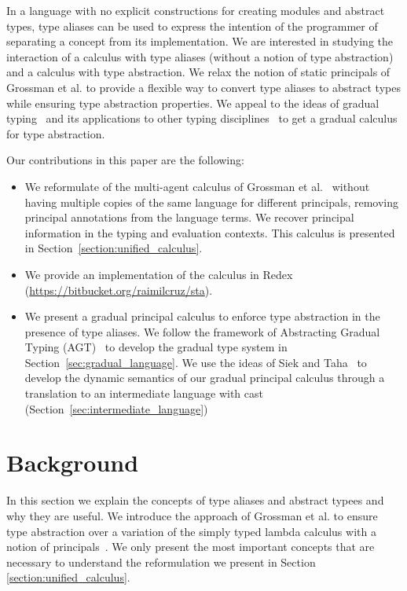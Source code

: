\documentclass{article}
\begin{document}
	In a language with no explicit constructions for creating modules and abstract types, type aliases can be used to express the intention of the programmer of separating a concept from its implementation. We are interested in studying the interaction of a calculus with type aliases (without a notion of type abstraction) and a calculus with type abstraction. We relax the notion of static principals of Grossman et al. to provide a flexible way to convert type aliases to abstract types while ensuring type abstraction properties. We appeal to the ideas of gradual typing~\cite{siekTaha:sfp2006, siekTaha:ecoop2007} and its applications to other typing disciplines~\cite{disneyFlanagan:stop2011, fennellThiemann:csf2013, wolffAl:ecoop2011, thiemannFennell:esop2014, banadosAl:icfp2014} to get a gradual calculus for type abstraction.
		
	Our contributions in this paper are the following:
	\begin{itemize}
		\item We reformulate of the multi-agent calculus of Grossman et al.~\cite{grossmanAl:toplas2000} without having multiple copies of the same language for different principals, removing principal annotations from the language terms. We recover principal information in the typing and evaluation contexts. This calculus is presented in Section~\ref{section:unified_calculus}. 
		\item We provide an implementation of the calculus in Redex~\cite{redex} (\url{https://bitbucket.org/raimilcruz/sta}). 
		\item We present a gradual principal calculus to enforce type abstraction in the presence of type aliases. We follow the framework of Abstracting Gradual Typing (AGT)~\cite{garciaAl:popl2016} to develop the gradual type system in Section~\ref{sec:gradual_language}. We use the ideas of Siek and Taha~\cite{siekTaha:sfp2006} to develop the dynamic semantics of our gradual principal calculus through a translation to an intermediate language with cast (Section~\ref{sec:intermediate_language})
	\end{itemize}	
	\section{Background}
	In this section we explain the concepts of type aliases and abstract typees and why they are useful. We introduce the approach of Grossman et al. to ensure type abstraction over a variation of the simply typed lambda calculus with a notion of principals~\cite{grossmanAl:toplas2000}. We only present the most important concepts that are necessary to understand the reformulation we present in Section \ref{section:unified_calculus}.	
\end{document}
